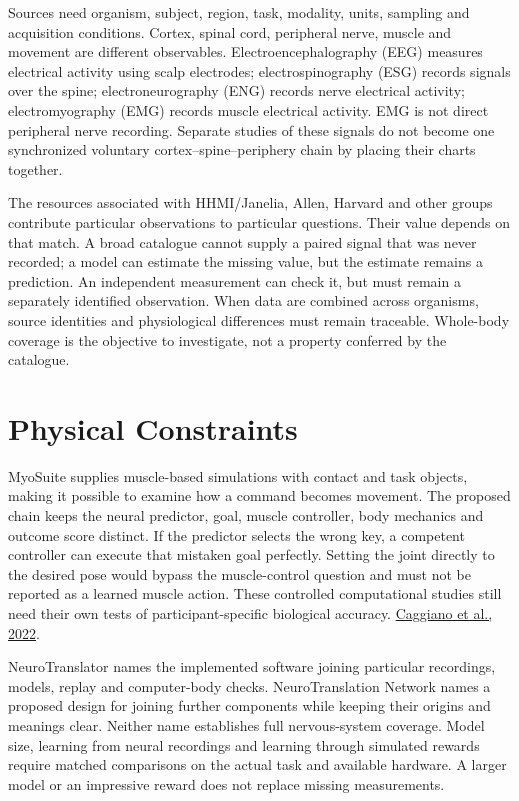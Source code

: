 Sources need organism, subject, region, task, modality, units, sampling and acquisition conditions. Cortex, spinal cord, peripheral nerve, muscle and movement are different observables. Electroencephalography (EEG) measures electrical activity using scalp electrodes; electrospinography (ESG) records signals over the spine; electroneurography (ENG) records nerve electrical activity; electromyography (EMG) records muscle electrical activity. EMG is not direct peripheral nerve recording. Separate studies of these signals do not become one synchronized voluntary cortex--spine--periphery chain by placing their charts together.\par

The resources associated with HHMI/Janelia, Allen, Harvard and other groups contribute particular observations to particular questions. Their value depends on that match. A broad catalogue cannot supply a paired signal that was never recorded; a model can estimate the missing value, but the estimate remains a prediction. An independent measurement can check it, but must remain a separately identified observation. When data are combined across organisms, source identities and physiological differences must remain traceable. Whole-body coverage is the objective to investigate, not a property conferred by the catalogue.\par

\section{Physical Constraints}

MyoSuite supplies muscle-based simulations with contact and task objects, making it possible to examine how a command becomes movement. The proposed chain keeps the neural predictor, goal, muscle controller, body mechanics and outcome score distinct. If the predictor selects the wrong key, a competent controller can execute that mistaken goal perfectly. Setting the joint directly to the desired pose would bypass the muscle-control question and must not be reported as a learned muscle action. These controlled computational studies still need their own tests of participant-specific biological accuracy. \href{https://proceedings.mlr.press/v168/caggiano22a.html}{Caggiano et al., 2022}.\par

NeuroTranslator names the implemented software joining particular recordings, models, replay and computer-body checks. NeuroTranslation Network names a proposed design for joining further components while keeping their origins and meanings clear. Neither name establishes full nervous-system coverage. Model size, learning from neural recordings and learning through simulated rewards require matched comparisons on the actual task and available hardware. A larger model or an impressive reward does not replace missing measurements.\par


